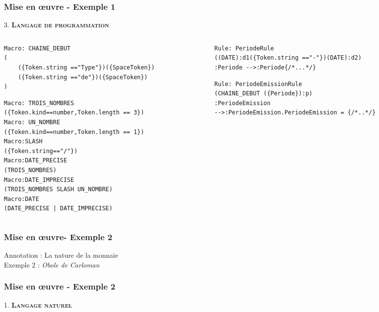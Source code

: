 \documentclass[10pt, compress]{beamer}
\begin{document}
\begin{frame}[fragile,t]
  \frametitle{Mise en œuvre - Exemple 1}
\begin{center}
 
\end{center}
3. \textbf{\textsc{\textbf{Langage de programmation}}}\\
\begin{columns}[t]
  \begin{column}{.5\linewidth}
 \begin{lstlisting}
Macro: CHAINE_DEBUT
(
    ({Token.string =="Type"})({SpaceToken})
    ({Token.string =="de"})({SpaceToken})
)
\end{lstlisting}
\begin{lstlisting}
Macro: TROIS_NOMBRES
({Token.kind==number,Token.length == 3})
Macro: UN_NOMBRE
({Token.kind==number,Token.length == 1})
Macro:SLASH
({Token.string=="/"})
Macro:DATE_PRECISE
(TROIS_NOMBRES)
Macro:DATE_IMPRECISE
(TROIS_NOMBRES SLASH UN_NOMBRE)
Macro:DATE
(DATE_PRECISE | DATE_IMPRECISE)
\end{lstlisting}
\end{column}


\begin{column}{.5\linewidth}
\begin{lstlisting}
Rule: PeriodeRule
((DATE):d1({Token.string =="-"})(DATE):d2)
:Periode -->:Periode{/*...*/}
\end{lstlisting}
\begin{lstlisting}
Rule: PeriodeEmissionRule
(CHAINE_DEBUT ({Periode}):p)
:PeriodeEmission
-->:PeriodeEmission.PeriodeEmission = {/*..*/}
\end{lstlisting}
\end{column}
\end{columns}
\end{frame}






\begin{frame}[fragile]
  \frametitle{Mise en œuvre- Exemple 2}
Annotation : La nature de la monnaie \\
Exemple 2 : \textit{Obole de Carloman}
\end{frame}

\begin{frame}[fragile,t]
  \frametitle{Mise en œuvre - Exemple 2}
\begin{center}
\end{center}
1. \textbf{\textsc{\textbf{Langage naturel}}}\\
\end{frame}
\end{document}
